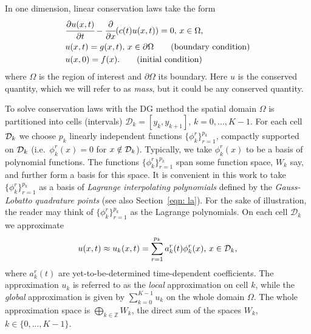 In one dimension, linear conservation laws take the form 
\begin{align}
	&\cfrac{\partial u( x, t)}{\partial t} - \cfrac{\partial}{\partial x} ( c(t) u( x, t)) = 0,\,  x \in \Omega, \label{eqn: cons law}
	\\& u( x,t)= g( x,t),\, x \in \partial \Omega\tag{boundary condition}
	\\& u( x,0)=f( x).\tag{initial condition}
\end{align}
where \(\Omega\) is the region of interest and \(\partial \Omega\) its boundary. Here \(u\) is the conserved quantity, which we will refer to as \emph{mass}, but it could be any conserved quantity. 

To solve conservation laws with the DG method the spatial domain \(\Omega\) is partitioned into cells (intervals) \(\mathcal D_k = [y_k,y_{k+1}]\), \(k=0,...,K-1\). For each cell \(\mathcal{D}_k\) we choose \(p_k\) linearly independent functions \(\{\phi^r_k\}_{r=1}^{p_k}\), compactly supported on \(\mathcal{D}_{k}\) (i.e.~\(\phi^r_k(x)=0\) for \(x\notin\mathcal{D}_{k}\)). Typically, we take \(\phi_k^r(x)\) to be a basis of polynomial functions. The functions \(\{\phi^r_k\}_{r=1}^{p_k}\) span some function space, \(W_k\) say, and further form a basis for this space. It is convenient in this work to take \(\{\phi^r_k\}_{r=1}^{p_k}\) as a basis of \emph{Lagrange interpolating polynomials} defined by the \emph{Gauss-Lobatto quadrature points} \citep{nodalDGBook} (see also Section~\ref{eqn: la}). For the sake of illustration, the reader may think of \(\{\phi^r_k\}_{r=1}^{p_k}\) as the Lagrange polynomials. On each cell \(\mathcal D_{k}\) we approximate 
\[u(x,t)\approx u_{k}(x,t)=\sum\limits_{r=1}^{p_k}a_{k}^r(t)\phi^r_k(x),\, x \in\mathcal{D}_k,\] 
where \(a_{k}^r(t)\) are yet-to-be-determined time-dependent coefficients. The approximation \(u_{k}\) is referred to as the \textit{local} approximation on cell \(k\), while the \textit{global} approximation is given by \(\sum\limits_{k=0}^{K-1} u_{k}\) on the whole domain \(\Omega\). The whole approximation space is \(\bigoplus\limits_{k\in\mathbb Z} W_k\), the direct sum of the spaces \(W_k\), \(k\in\{0,...,K-1\}\).

